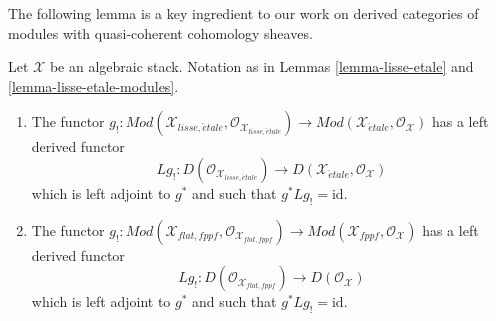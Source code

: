 \noindent
The following lemma is a key ingredient to our work on derived
categories of modules with quasi-coherent cohomology sheaves.

\begin{lemma}
\label{lemma-shriek-derived}
Let $\mathcal{X}$ be an algebraic stack.
Notation as in Lemmas \ref{lemma-lisse-etale} and
\ref{lemma-lisse-etale-modules}.
\begin{enumerate}
\item The functor $g_! : 
\textit{Mod}(\mathcal{X}_{lisse,\acute{e}tale},
\mathcal{O}_{\mathcal{X}_{lisse,\acute{e}tale}}) \to
\textit{Mod}(\mathcal{X}_{\acute{e}tale}, \mathcal{O}_{\mathcal{X}})$
has a left derived functor
$$
Lg_! :
D(\mathcal{O}_{\mathcal{X}_{lisse,\acute{e}tale}})
\longrightarrow
D(\mathcal{X}_{\acute{e}tale}, \mathcal{O}_\mathcal{X})
$$
which is left adjoint to $g^*$ and such that $g^*Lg_! = \text{id}$.
\item The functor $g_! :
\textit{Mod}(\mathcal{X}_{flat,fppf},
\mathcal{O}_{\mathcal{X}_{flat,fppf}}) \to
\textit{Mod}(\mathcal{X}_{fppf}, \mathcal{O}_{\mathcal{X}})$
has a left derived functor
$$
Lg_! :
D(\mathcal{O}_{\mathcal{X}_{flat, fppf}})
\longrightarrow
D(\mathcal{O}_\mathcal{X})
$$
which is left adjoint to $g^*$ and such that $g^*Lg_! = \text{id}$.
\end{enumerate}
\end{lemma}

